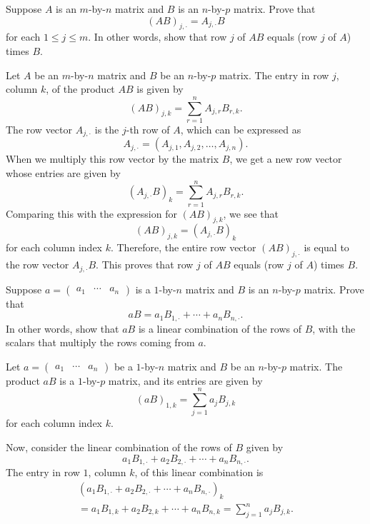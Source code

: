 \begin{exc}
\begin{exercise}
Suppose $A$ is an $m$-by-$n$ matrix and $B$ is an $n$-by-$p$ matrix. Prove
that
\[ (AB)_{j,\cdot} = A_{j,\cdot}B \]
for each $1\le j\le m$. In other words, show that row $j$ of $AB$ equals (row
$j$ of $A$) times $B$.
\end{exercise}
\begin{solution}
Let $A$ be an $m$-by-$n$ matrix and $B$ be an $n$-by-$p$ matrix. The entry in
row $j$, column $k$, of the product $AB$ is given by
\[ (AB)_{j,k} = \sum_{r=1}^n A_{j,r}B_{r,k}. \]
The row vector $A_{j,\cdot}$ is the $j$-th row of $A$, which can be expressed
as
\[ A_{j,\cdot} = (A_{j,1},A_{j,2},\dots,A_{j,n}). \]
When we multiply this row vector by the matrix $B$, we get a new row vector
whose entries are given by
\[ (A_{j,\cdot}B)_k = \sum_{r=1}^n A_{j,r}B_{r,k}. \]
Comparing this with the expression for $(AB)_{j,k}$, we see that
\[ (AB)_{j,k} = (A_{j,\cdot}B)_k \]
for each column index $k$. Therefore, the entire row vector $(AB)_{j,\cdot}$ is
equal to the row vector $A_{j,\cdot}B$. This proves that row $j$ of $AB$ equals
(row $j$ of $A$) times $B$.
\end{solution}

\begin{exercise}
Suppose $a=\begin{pmatrix} a_1 & \cdots & a_n \end{pmatrix}$ is a $1$-by-$n$
matrix and $B$ is an $n$-by-$p$ matrix. Prove that
\[ aB = a_1B_{1,\cdot}+\cdots+a_nB_{n,\cdot}. \]
In other words, show that $aB$ is a linear combination of the rows of $B$, with
the scalars that multiply the rows coming from $a$.
\end{exercise}
\begin{solution}
Let $a=\begin{pmatrix} a_1 & \cdots & a_n \end{pmatrix}$ be a $1$-by-$n$
matrix and $B$ be an $n$-by-$p$ matrix. The product $aB$ is a $1$-by-$p$
matrix, and its entries are given by
\[ (aB)_{1,k} = \sum_{j=1}^n a_jB_{j,k} \]
for each column index $k$.

Now, consider the linear combination of the rows of $B$ given by
\[ a_1B_{1,\cdot}+a_2B_{2,\cdot}+\cdots+a_nB_{n,\cdot}. \]
The entry in row $1$, column $k$, of this linear combination is
\begin{multline*}
(a_1B_{1,\cdot}+a_2B_{2,\cdot}+\cdots+a_nB_{n,\cdot})_k\\
  = a_1B_{1,k}+a_2B_{2,k}+\cdots+a_nB_{n,k} = \sum_{j=1}^n a_jB_{j,k}.
\end{multline*}


\end{solution}
\end{exc}
